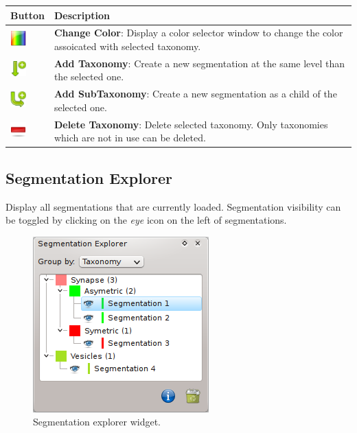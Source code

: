 \begin{tabular}{| m{1.3cm} | m{12cm} |}
\hline
\textbf{Button} & \textbf{Description}\\
\hline
\includegraphics[width=0.6cm]{../../frontend/rsc/rainbow} &
\textbf{Change Color}: Display a color selector window to change the color
assoicated with selected taxonomy.\\
\hline
\includegraphics[width=0.6cm]{../../frontend/rsc/create_node} &
\textbf{Add Taxonomy}: Create a new segmentation at the same level than the
selected one.\\
\hline
\includegraphics[width=0.6cm]{../../frontend/rsc/create_subnode} &
\textbf{Add SubTaxonomy}: Create a new segmentation as a child of the selected
one.\\
\hline
\includegraphics[width=0.6cm]{../../frontend/rsc/remove} &
\textbf{Delete Taxonomy}: Delete selected taxonomy. Only taxonomies which are
not in use can be deleted.\\
\hline
\end{tabular}
\vspace{0.3cm}

\subsection{Segmentation Explorer}
Display all segmentations that are currently loaded. Segmentation visibility can
be toggled by clicking on the \textit{eye} icon on the left of segmentations.
\begin{figure}[H]
\centering
\includegraphics{fig/SegmentationExplorer}
\caption{Segmentation explorer widget.}
\end{figure}

